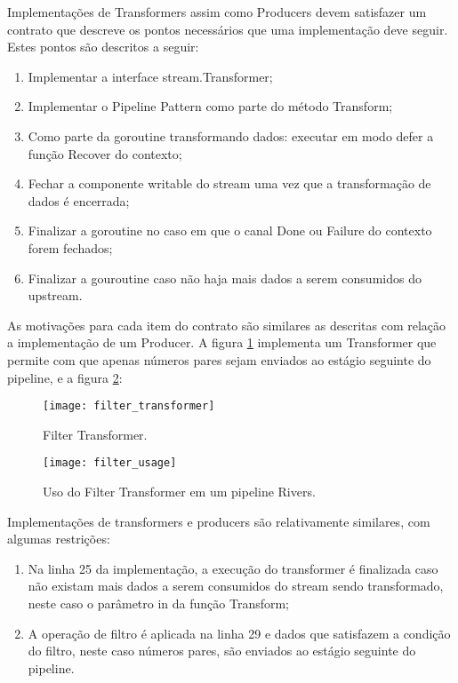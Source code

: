 Implementações de Transformers assim como Producers devem satisfazer um contrato que descreve os pontos necessários que uma implementação deve seguir. Estes pontos são descritos a seguir:

\begin{enumerate}
  \item Implementar a interface stream.Transformer;
  \item Implementar o Pipeline Pattern como parte do método Transform;
  \item Como parte da goroutine transformando dados: executar em modo defer a função Recover do contexto;
  \item Fechar a componente writable do stream uma vez que a transformação de dados é encerrada;
  \item Finalizar a goroutine no caso em que o canal Done ou Failure do contexto forem fechados;
  \item Finalizar a gouroutine caso não haja mais dados a serem consumidos do upstream.
\end{enumerate}

As motivações para cada item do contrato são similares as descritas com relação a implementação de um Producer. A figura \ref{code:rivers:filter_transformer} implementa um Transformer que permite com que apenas números pares sejam enviados ao estágio seguinte do pipeline, e a figura \ref{code:rivers:filter_usage}:

\begin{figure}[H]
  \texttt{[image: filter\_transformer]}
  \centering
  \caption{Filter Transformer.}
  \label{code:rivers:filter_transformer}
\end{figure}

\begin{figure}[H]
  \texttt{[image: filter\_usage]}
  \centering
  \caption{Uso do Filter Transformer em um pipeline Rivers.}
  \label{code:rivers:filter_usage}
\end{figure}

Implementações de transformers e producers são relativamente similares, com algumas restrições:

\begin{enumerate}
  \item Na linha 25 da implementação, a execução do transformer é finalizada caso não existam mais dados a serem consumidos do stream sendo transformado, neste caso o parâmetro in da função Transform;
  \item A operação de filtro é aplicada na linha 29 e dados que satisfazem a condição do filtro, neste caso números pares, são enviados ao estágio seguinte do pipeline.
\end{enumerate}

